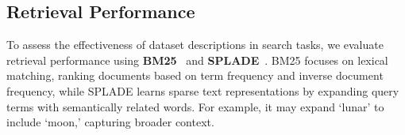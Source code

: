 \vspace{-.2cm}
\subsection{Retrieval Performance}

To assess the effectiveness of dataset descriptions in search tasks, we evaluate retrieval performance using \textbf{BM25}~\cite{robertson2009bm25} and \textbf{SPLADE}~\cite{formal2021splade}. BM25 focuses on lexical matching, ranking documents based on term frequency and inverse document frequency, while SPLADE learns sparse text representations by expanding query terms with semantically related words. For example, it may expand `lunar' to include `moon,' capturing broader context.


% 
% 
% 

